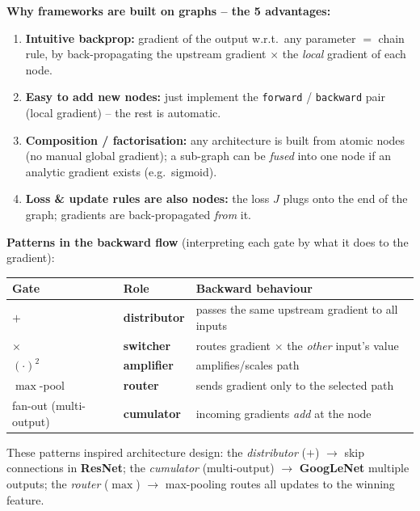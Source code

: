 \documentclass[10pt,a4paper]{article}
\begin{document}
	\textbf{Why frameworks are built on graphs -- the 5 advantages:}
	\begin{enumerate}[leftmargin=*]
		\item \textbf{Intuitive backprop:} gradient of the output w.r.t.\ any parameter $=$ chain rule, by back-propagating the upstream gradient $\times$ the \emph{local} gradient of each node.
		\item \textbf{Easy to add new nodes:} just implement the \texttt{forward} / \texttt{backward} pair (local gradient) -- the rest is automatic.
		\item[3--4.] \textbf{Composition / factorisation:} any architecture is built from atomic nodes (no manual global gradient); a sub-graph can be \emph{fused} into one node if an analytic gradient exists (e.g.\ sigmoid).
		\item[5.] \textbf{Loss \& update rules are also nodes:} the loss $J$ plugs onto the end of the graph; gradients are back-propagated \emph{from} it.
	\end{enumerate}

	\textbf{Patterns in the backward flow} (interpreting each gate by what it does to the gradient):

	\begin{center}
	\begin{tabular}{@{}llp{8.2cm}@{}}
		\toprule
		Gate & Role & Backward behaviour \\
		\midrule
		$+$        & \textbf{distributor} & passes the same upstream gradient to all inputs \\
		$\times$   & \textbf{switcher}     & routes gradient $\times$ the \emph{other} input's value \\
		$(\cdot)^2$ & \textbf{amplifier} & amplifies/scales path \\
		$\max$-pool &  \textbf{router} & sends gradient only to the selected path \\
		fan-out (multi-output) & \textbf{cumulator} & incoming gradients \emph{add} at the node \\
		\bottomrule
	\end{tabular}
	\end{center}

	\begin{importantbox}
		These patterns inspired architecture design: the \emph{distributor} ($+$) $\to$ skip connections in \textbf{ResNet}; the \emph{cumulator} (multi-output) $\to$ \textbf{GoogLeNet} multiple outputs; the \emph{router} ($\max$) $\to$ max-pooling routes all updates to the winning feature.
	\end{importantbox}
\end{document}

